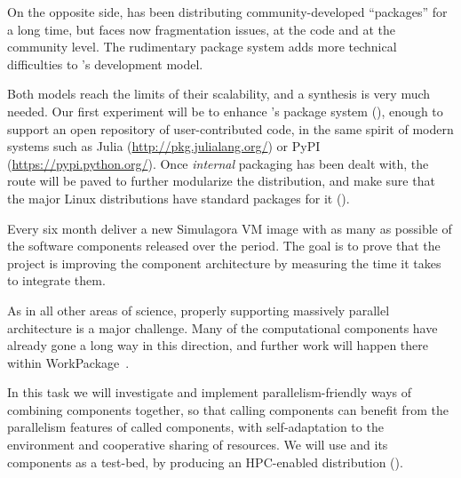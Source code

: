\begin{workpackage}[id=component-architecture,wphases=0-48!.5,
  title=Component Architecture,lead=UV,
  PSRM=24,UVRM=8,SARM=16, USHRM=4, USORM=6]
\begin{tasklist}
\begin{task}[title=Modularization and packaging,id=mod-packaging,lead=UV,PM=32]
    On the opposite side, \GAP has been distributing
    community-developed ``\GAP packages'' for a long time, but faces
    now fragmentation issues, at the code and at the community
    level. The rudimentary package system adds more technical
    difficulties to \GAP's development model.

    Both models reach the limits of their scalability, and a synthesis
    is very much needed.  Our first experiment will be to enhance
    \Sage's package system
    (), enough to
    support an open repository of user-contributed code, in the same
    spirit of modern systems such as Julia
    (\url{http://pkg.julialang.org/}) or PyPI
    (\url{https://pypi.python.org/}).  Once \emph{internal} packaging
    has been dealt with, the route will be paved to further modularize
    the \Sage distribution, and make sure that the major Linux
    distributions have standard packages for it
    ().

  \end{task}

\begin{task}[id=simulagora-dev,title=Simulagora integration,PM=4,lead=LL]
  Every six month deliver a new Simulagora VM image with as many as possible of the software
  components released over the period. The goal is to prove that the project is
  improving the component architecture by measuring the time it takes to
  integrate them.
\end{task}


  \begin{task}[title=Component architecture for High Performance Computing and Parallelism,id=component-for-HPC,PM=12]
    As in all other areas of science, properly supporting massively
    parallel architecture is a major challenge. Many of the
    computational components have already gone a long way in this
    direction, and further work will happen there within
    WorkPackage~.

    In this task we will investigate and implement
    parallelism-friendly ways of combining components together, so
    that calling components can benefit from the parallelism features
    of called components, with self-adaptation to the environment and
    cooperative sharing of resources. We will use \Sage and its
    components as a test-bed, by producing an HPC-enabled distribution
    ().
  \end{task}


\end{tasklist}
\end{workpackage}
